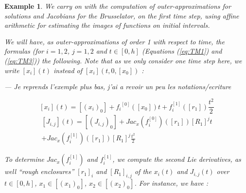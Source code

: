 \documentclass{sig-alternate-05-2015} %
\newcommand\ForAuthors[1]%
 {\par\smallskip                     %
  \begin{center}%
   \fbox%
   {\parbox{0.9\linewidth}%
    {\raggedright\sc--- #1}%
   }%
  \end{center}%
  \par\smallskip                     %
 }
\newtheorem{example}{Example}
\def\int#1{\mbox{$[ #1 ]$}}
\begin{document}
\begin{example}
\label{running2}
We carry on with the computation of outer-approximations for solutions and Jacobians for 
the Brusselator, on the first time
step, using affine arithmetic for estimating the images of functions on initial intervals.


We will have, as outer-approximations of order 1 with respect to time, the formulas (for $i=1, 2$, $j=1, 2$
and $t \in [0,h]$ (Equations (\ref{eq:TM1}) and (\ref{eq:TM3})) the following. Note that
as we only consider one time step here, we write $\int{x_i}(t)$ instead of $\int{x_i}(t,0,\int{x_0})$ :  

\ForAuthors{Je reprends l'exemple plus bas, j'ai a revoir un peu les notations/ecriture}

\begin{equation}
\int{x_i}(t) = \int{(x_i)_0} + {f_i}^{[0]}(\int{x_0}) t + f_i^{[1]}(\int{r_1}) \frac{t^2}{2}
\end{equation}
\begin{multline}
\int{J_{i,j}}(t) =  \int{(J_{i,j})_0}+Jac_x(f_{i}^{[0]})(\int{r_1})\int{R_1}^j t \\
+ Jac_x(f_{i}^{[1]})(\int{r_1})\int{R_1}^j \frac{t^2}{2} 
\label{TaylorJ}
\end{multline}


To determine $Jac_x(f_i^{[1]})$ and $f_i^{[1]}$, we compute the second Lie derivatives, as well ``rough enclosures''
$\int{r_1}_i$ and $\int{R_1}_{i,j}$ of the $x_i(t)$ and $J_{i,j}(t)$ over $t\in [0,h]$, 
$x_1 \in \int{(x_1)_0}$, $x_2 \in \int{(x_2)_0}$. For instance, we have : 


\end{example}
\end{document}
